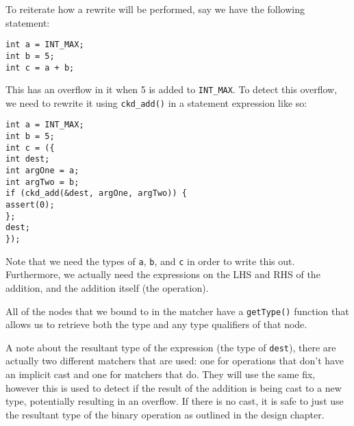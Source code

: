 To reiterate how a rewrite will be performed, say we have the following statement:
\begin{center}
\parbox{0.9\linewidth}{
\texttt{int a = INT\_MAX;\\
int b = 5;\\
int c = a + b;}
}
\end{center}

This has an overflow in it when 5 is added to \texttt{INT\_MAX}. To detect this overflow, we need to rewrite it using \texttt{ckd\_add()} in a statement expression like so:

\begin{center}
\parbox{0.9\linewidth}{
\texttt{int a = INT\_MAX;\\
int b = 5;\\
int c = (\{\\
\hspace*{1.5em}int dest;\\
\hspace*{1.5em}int argOne = a;\\
\hspace*{1.5em}int argTwo = b;\\
\hspace*{1.5em}if (ckd\_add(\&dest, argOne, argTwo)) \{\\
\hspace*{3em}assert(0);\\
\hspace*{1.5em}\};\\
\hspace*{1.5em}dest;\\
\});}
}
\end{center}

Note that we need the types of \texttt{a}, \texttt{b}, and \texttt{c} in order to write this out. Furthermore, we actually need the expressions on the LHS and RHS of the addition, and the addition itself (the operation).

All of the nodes that we bound to in the matcher have a \texttt{getType()} function that allows us to retrieve both the type and any type qualifiers of that node.

A note about the resultant type of the expression (the type of \texttt{dest}), there are actually two different matchers that are used: one for operations that don't have an implicit cast and one for matchers that do. They will use the same fix, however this is used to detect if the result of the addition is being cast to a new type, potentially resulting in an overflow. If there is no cast, it is safe to just use the resultant type of the binary operation as outlined in the design chapter.

